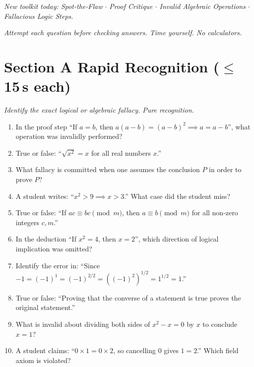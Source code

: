 \documentclass[11pt,a4paper]{article}
\begin{document}
\noindent\textit{New toolkit today: Spot-the-Flaw $\cdot$ Proof Critique $\cdot$ Invalid Algebraic Operations $\cdot$ Fallacious Logic Steps.}

\vspace{2pt}
\noindent\textit{Attempt each question before checking answers. Time yourself. No calculators.}

\section*{Section A \quad Rapid Recognition \hfill{\normalfont\small($\leq$15\,s each)}}

\noindent\textit{Identify the exact logical or algebraic fallacy. Pure recognition.}

\begin{enumerate}

\item In the proof step ``If $a=b$, then $a(a-b)=(a-b)^2 \implies a = a-b$'', what operation was invalidly performed?

\item True or false: ``$\sqrt{x^2} = x$ for all real numbers $x$.''

\item What fallacy is committed when one assumes the conclusion $P$ in order to prove $P$?

\item A student writes: ``$x^2 > 9 \implies x > 3$.'' What case did the student miss?

\item True or false: ``If $ac \equiv bc \pmod m$, then $a \equiv b \pmod m$ for all non-zero integers $c, m$.''

\item In the deduction ``If $x^2 = 4$, then $x=2$'', which direction of logical implication was omitted?

\item Identify the error in: ``Since $-1 = (-1)^1 = (-1)^{2/2} = ((-1)^2)^{1/2} = 1^{1/2} = 1$.''

\item True or false: ``Proving that the converse of a statement is true proves the original statement.''

\item What is invalid about dividing both sides of $x^2 - x = 0$ by $x$ to conclude $x=1$?

\item A student claims: ``$0 \times 1 = 0 \times 2$, so cancelling $0$ gives $1 = 2$.'' Which field axiom is violated?

\end{enumerate}
\end{document}
